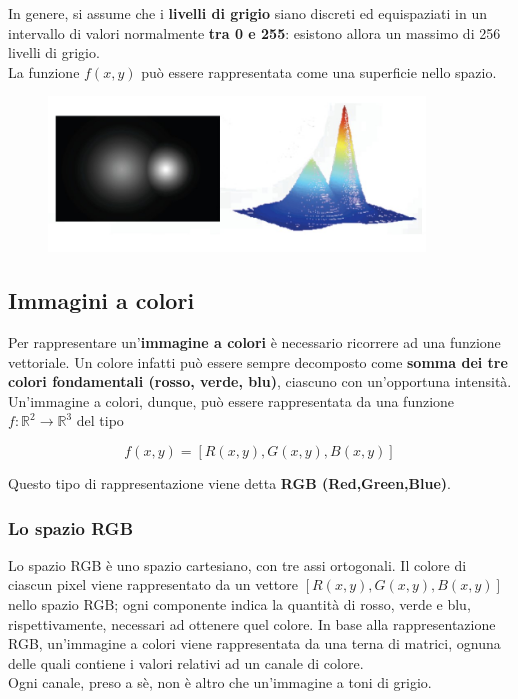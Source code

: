 In genere, si assume che i \textbf{livelli di grigio} siano discreti ed
equispaziati in un intervallo di valori normalmente \textbf{tra 0 e 255}:
esistono allora un massimo di 256 livelli di grigio.
\\
La funzione $f (x , y)$ può essere rappresentata come una superficie
nello spazio.

\begin{figure}[H]
    \centering
    \includegraphics[width=10cm, keepaspectratio]{capitoli/immagini/imgs/funzione_toni_grigio.jpg}
\end{figure}

\subsection{Immagini a colori}

Per rappresentare un'\textbf{immagine a colori} è necessario ricorrere ad
una funzione vettoriale. Un colore infatti può essere sempre
decomposto come \textbf{somma dei tre colori fondamentali (rosso, verde,
    blu)}, ciascuno con un'opportuna intensità.
Un'immagine a colori, dunque, può essere rappresentata da una
funzione $f: \mathbb{R}^2 \rightarrow \mathbb{R}^3$ del tipo

$$
    f(x, y) = [R(x, y), G(x, y), B(x, y)]
$$

Questo tipo di rappresentazione viene detta \textbf{RGB (Red,Green,Blue)}.
\subsubsection{Lo spazio RGB}

Lo spazio RGB è uno spazio cartesiano, con tre assi ortogonali.
Il colore di ciascun pixel viene rappresentato da un vettore
$[R(x , y), G(x , y), B(x , y)]$ nello spazio RGB; ogni componente
indica la quantità di rosso, verde e blu, rispettivamente, necessari
ad ottenere quel colore.
In base alla rappresentazione RGB, un'immagine a colori viene
rappresentata da una terna di matrici, ognuna delle quali contiene i
valori relativi ad un canale di colore.\\
Ogni canale, preso a sè, non è altro che un'immagine a toni di
grigio.

